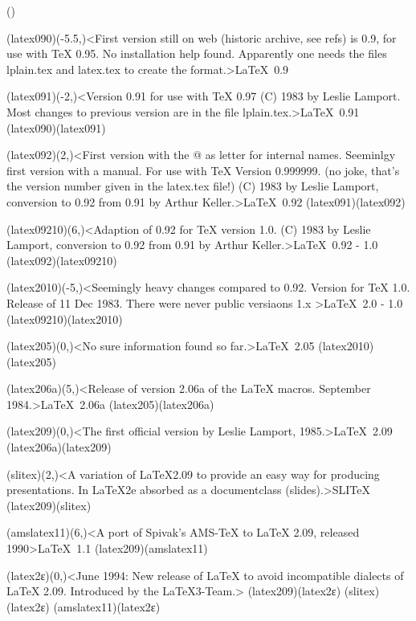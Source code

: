 \documentclass[
%
]{scrartcl}
\begin{document}
\clearpage
\tograph*(){
	\tonode(latex090)(-5.5,\layer)<First version still on web (historic archive, see refs) is 0.9, for use with TeX 0.95. No installation help found. Apparently one needs the files lplain.tex and latex.tex to create the format.>{\LaTeX\ 0.9}
	
	\steplayer
	\tonode(latex091)(-2,\layer)<Version 0.91 for use with TeX 0.97 (C) 1983 by Leslie Lamport. Most changes to previous version are in the file lplain.tex.>{\LaTeX\ 0.91}
	\todraw(latex090)(latex091)
	
	\steplayer[-0.4]
	\tonode(latex092)(2,\layer)<First version with the @ as letter for internal names. Seeminlgy first version with a manual. For use with TeX Version 0.999999. (no joke, that's the version number given in the latex.tex file!) (C) 1983 by Leslie Lamport, conversion to 0.92 from 0.91 by Arthur Keller.>{\LaTeX\ 0.92}
	\todraw(latex091)(latex092)
	
	\steplayer[-0.4]
	\tonode(latex09210)(6,\layer)<Adaption of 0.92 for TeX version 1.0. (C) 1983 by Leslie Lamport, conversion to 0.92 from 0.91 by Arthur Keller.>{\LaTeX\ 0.92 - 1.0}
	\todraw(latex092)(latex09210)
	
	\steplayer[-1.8]
	\tonode(latex2010)(-5,\layer)<Seemingly heavy changes compared to 0.92. Version for TeX 1.0. Release of 11 Dec 1983. There were never public versiaons 1.x >{\LaTeX\ 2.0 - 1.0}
	\todraw(latex09210)(latex2010)
	
	\steplayer[-.4]
	\tonode(latex205)(0,\layer)<No sure information found so far.>{\LaTeX\ 2.05}
	\todraw(latex2010)(latex205)
	
	\steplayer[-.4]
	\tonode(latex206a)(5,\layer)<Release of version 2.06a of the LaTeX macros. September 1984.>{\LaTeX\ 2.06a}
	\todraw(latex205)(latex206a)
	
	\steplayer[-2.3]
	\tonode[\vip](latex209)(0,\layer)<The first official version by Leslie Lamport, 1985.>{\LaTeX\ 2.09}
	\todraw(latex206a)(latex209)
	
	\steplayer[-2]
	\tonode(slitex)(2,\layer)<A variation of LaTeX2.09 to provide an easy way for producing presentations. In LaTeX2e absorbed as a documentclass (slides).>{SLI\TeX}
	\todraw(latex209)(slitex)
	
	\tonode(amslatex11)(6,\layer)<A port of Spivak's AMS-TeX to LaTeX 2.09, released 1990>{\AMS\LaTeX\ 1.1}
	\todraw(latex209)(amslatex11)
	
	\steplayer[-1.7]
	\tonode[\vip](latex2ε)(0,\layer)<June 1994: New release of LaTeX to avoid incompatible dialects of LaTeX 2.09. Introduced by the LaTeX3-Team.>{\LaTeXe}
	\todraw*(latex209)(latex2ε)
	\todraw[dashed](slitex)(latex2ε)
	\todraw[dashed](amslatex11)(latex2ε)
	\steplayer[-1.3]

}
\end{document}
